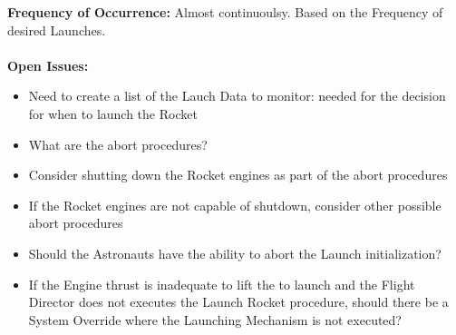 \documentclass[letterpaper]{article}
\begin{document}
\textbf{Frequency of Occurrence:  }Almost continuoulsy.  Based on the
Frequency of desired Launches.\\\\
\textbf{Open Issues:  }
\begin{itemize}
\item Need to create a list of the Lauch Data to monitor:  needed for
the decision for when to launch the Rocket
\item What are the abort procedures?
\item Consider shutting down the Rocket engines as part of the abort
procedures
\item If the Rocket engines are not capable of shutdown, consider
other possible abort procedures
\item Should the Astronauts have the ability to abort the Launch
initialization?
\item If the Engine thrust is inadequate to lift the to launch and
the Flight Director does not executes the Launch Rocket procedure,
should there be a System Override where the Launching Mechanism is not
executed?
\end{itemize}
\end{document}
